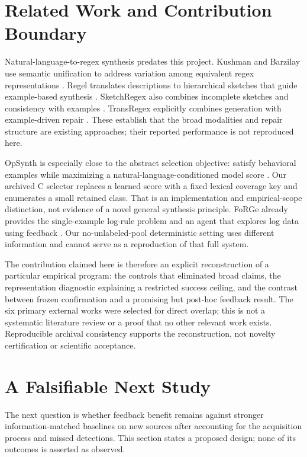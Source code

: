 \documentclass[10pt,twocolumn,letterpaper]{article}
\begin{document}
\section{Related Work and Contribution Boundary}
Natural-language-to-regex synthesis predates this project. Kushman and Barzilay use semantic unification to address variation among equivalent regex representations \cite{kushman2013}. Regel translates descriptions to hierarchical sketches that guide example-based synthesis \cite{regel2020}. SketchRegex also combines incomplete sketches and consistency with examples \cite{sketchregex2020}. TransRegex explicitly combines generation with example-driven repair \cite{transregex2021}. These establish that the broad modalities and repair structure are existing approaches; their reported performance is not reproduced here.

OpSynth is especially close to the abstract selection objective: satisfy behavioral examples while maximizing a natural-language-conditioned model score \cite{opsynth2021}. Our archived C selector replaces a learned score with a fixed lexical coverage key and enumerates a small retained class. That is an implementation and empirical-scope distinction, not evidence of a novel general synthesis principle. FoRGe already provides the single-example log-rule problem and an agent that explores log data using feedback \cite{forge2026}. Our no-unlabeled-pool deterministic setting uses different information and cannot serve as a reproduction of that full system.

The contribution claimed here is therefore an explicit reconstruction of a particular empirical program: the controls that eliminated broad claims, the representation diagnostic explaining a restricted success ceiling, and the contrast between frozen confirmation and a promising but post-hoc feedback result. The six primary external works were selected for direct overlap; this is not a systematic literature review or a proof that no other relevant work exists. Reproducible archival consistency supports the reconstruction, not novelty certification or scientific acceptance.

\section{A Falsifiable Next Study}
\label{sec:future}
The next question is whether feedback benefit remains against stronger information-matched baselines on new sources after accounting for the acquisition process and missed detections. This section states a proposed design; none of its outcomes is asserted as observed.
\end{document}
